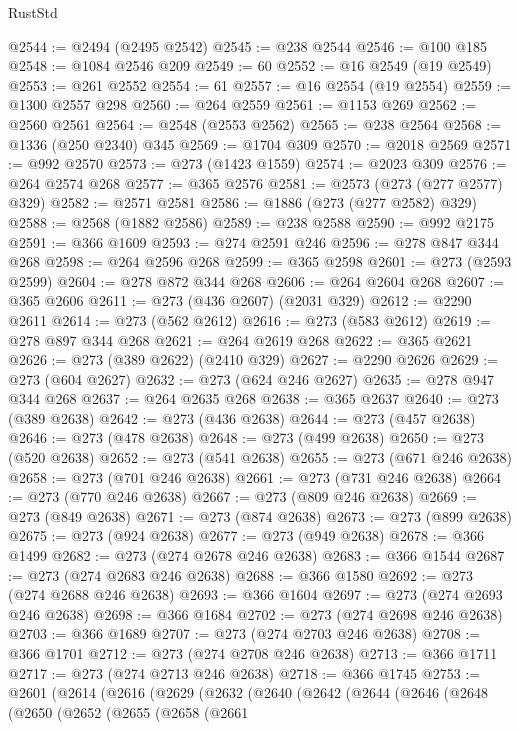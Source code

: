 \begin{lexlean}{RustStd}
\begin{coremodule}
{{{{{{{{{{{{{{{{{{{@2544 := @2494 (@2495 @2542)
@2545 := @238 @2544
@2546 := @100 @185
@2548 := @1084 @2546 @209
@2549 := 60
@2552 := @16 @2549 (@19 @2549)
@2553 := @261 @2552
@2554 := 61
@2557 := @16 @2554 (@19 @2554)
@2559 := @1300 @2557 @298
@2560 := @264 @2559
@2561 := @1153 @269
@2562 := @2560 @2561
@2564 := @2548 (@2553 @2562)
@2565 := @238 @2564
@2568 := @1336 (@250 @2340) @345
@2569 := @1704 @309
@2570 := @2018 @2569
@2571 := @992 @2570
@2573 := @273 (@1423 @1559)
@2574 := @2023 @309
@2576 := @264 @2574 @268
@2577 := @365 @2576
@2581 := @2573 (@273 (@277 @2577) @329)
@2582 := @2571 @2581
@2586 := @1886 (@273 (@277 @2582) @329)
@2588 := @2568 (@1882 @2586)
@2589 := @238 @2588
@2590 := @992 @2175
@2591 := @366 @1609
@2593 := @274 @2591 @246
@2596 := @278 @847 @344 @268
@2598 := @264 @2596 @268
@2599 := @365 @2598
@2601 := @273 (@2593 @2599)
@2604 := @278 @872 @344 @268
@2606 := @264 @2604 @268
@2607 := @365 @2606
@2611 := @273 (@436 @2607) (@2031 @329)
@2612 := @2290 @2611
@2614 := @273 (@562 @2612)
@2616 := @273 (@583 @2612)
@2619 := @278 @897 @344 @268
@2621 := @264 @2619 @268
@2622 := @365 @2621
@2626 := @273 (@389 @2622) (@2410 @329)
@2627 := @2290 @2626
@2629 := @273 (@604 @2627)
@2632 := @273 (@624 @246 @2627)
@2635 := @278 @947 @344 @268
@2637 := @264 @2635 @268
@2638 := @365 @2637
@2640 := @273 (@389 @2638)
@2642 := @273 (@436 @2638)
@2644 := @273 (@457 @2638)
@2646 := @273 (@478 @2638)
@2648 := @273 (@499 @2638)
@2650 := @273 (@520 @2638)
@2652 := @273 (@541 @2638)
@2655 := @273 (@671 @246 @2638)
@2658 := @273 (@701 @246 @2638)
@2661 := @273 (@731 @246 @2638)
@2664 := @273 (@770 @246 @2638)
@2667 := @273 (@809 @246 @2638)
@2669 := @273 (@849 @2638)
@2671 := @273 (@874 @2638)
@2673 := @273 (@899 @2638)
@2675 := @273 (@924 @2638)
@2677 := @273 (@949 @2638)
@2678 := @366 @1499
@2682 := @273 (@274 @2678 @246 @2638)
@2683 := @366 @1544
@2687 := @273 (@274 @2683 @246 @2638)
@2688 := @366 @1580
@2692 := @273 (@274 @2688 @246 @2638)
@2693 := @366 @1604
@2697 := @273 (@274 @2693 @246 @2638)
@2698 := @366 @1684
@2702 := @273 (@274 @2698 @246 @2638)
@2703 := @366 @1689
@2707 := @273 (@274 @2703 @246 @2638)
@2708 := @366 @1701
@2712 := @273 (@274 @2708 @246 @2638)
@2713 := @366 @1711
@2717 := @273 (@274 @2713 @246 @2638)
@2718 := @366 @1745
@2753 := @2601
    (@2614
      (@2616
        (@2629
          (@2632
            (@2640
              (@2642
                (@2644
                  (@2646
                    (@2648
                      (@2650
                        (@2652
                          (@2655
                            (@2658
                              (@2661
}}}}}}}}}}}}}}}}}}}
\end{coremodule}
\end{lexlean}
